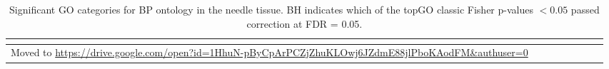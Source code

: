 \begin{longtable}{llllrlrr}
\caption{Significant GO categories for BP ontology in the needle tissue. BH indicates which of the topGO classic Fisher p-values $< 0.05$ passed correction at FDR = 0.05.}\\
\label{tab:go-needle-BP}\\
\toprule
    Moved to \scriptsize{\url{https://drive.google.com/open?id=1HhuN-pByCpArPCZjZhuKLOwj6JZdmE88jlPboKAodFM&authuser=0}} \\
 
\bottomrule
\end{longtable}
